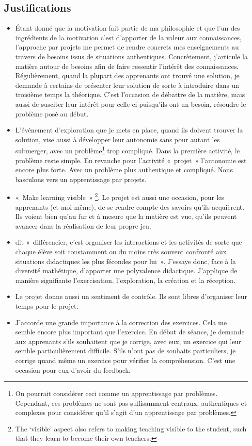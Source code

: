 \clearpage
\subsection{Justifications}
\begin{itemize}
    \item Étant donné que la motivation fait partie de ma philosophie et que l’un des ingrédients de la motivation c’est d’apporter de la valeur aux connaissances\cite{viau1994motivation}, l’approche par projets me permet de rendre concrets mes enseignements au travers de besoins issus de situations authentiques. Concrètement, j'articule la matière autour de besoins afin de faire ressentir l'intérêt des connaissances. Régulièrement, quand la plupart des apprenants ont trouvé une solution, je demande à certains de présenter leur solution de sorte à introduire dans un troisième temps la théorique.  C’est l’occasion de débattre de la matière, mais aussi de susciter leur intérêt pour celle-ci puisqu’ils ont un besoin, résoudre le problème posé au début.
    \item L'évènement d'exploration que je mets en place, quand ils doivent trouver la solution, vise aussi à développer leur autonomie sans pour autant les submerger, avec un problème\footnote{On pourrait considérer ceci comme un apprentissage par problèmes. Cependant, ces problèmes ne sont pas suffisamment centraux, authentiques et complexes pour considérer qu’il s’agit d’un apprentissage par problèmes.} trop compliqué. Dans la première activité, le problème reste simple. En revanche pour l'activité «~projet~» l’autonomie est encore plus forte. Avec un problème plus authentique et compliqué. Nous basculons vers un apprentissage par projets.
    \item «~Make learning visible~» \footnote{The ‘visible’ aspect also refers to making teaching visible to the student, such that they learn to become their own teachers.}\cite{hattie2012visible}. Le projet est aussi une occasion, pour les apprenants (et moi-même), de se rendre compte des savoirs qu'ils acquièrent. Ils voient bien qu'au fur et à mesure que la matière est vue, qu’ils peuvent avancer dans la réalisation de leur propre jeu.
    \item \citet{perrenoud1992differenciation} dit «~différencier, c’est organiser les interactions et les activités de sorte que chaque élève soit constamment ou du moins très souvent confronté aux situations didactiques les plus fécondes pour lui~». J’essaye donc, face à la diversité mathétique, d’apporter une polyvalence didactique. J'applique de manière signifiante l'exercisation, l'exploration, la création et la réception.
    \item Le projet donne aussi un sentiment de contrôle. Ils sont libres d'organiser leur temps pour le projet.
    \item J'accorde une grande importance à la correction des exercices. Cela me semble encore plus important que l'exercice. En début de séance, je demande aux apprenants s'ils souhaitent que je corrige, avec eux, un exercice qui leur semble particulièrement difficile. S’ils n’ont pas de souhaits particuliers, je corrige quand même un exercice pour vérifier la compréhension. C'est une occasion pour eux d’avoir du feedback.
\end{itemize}
